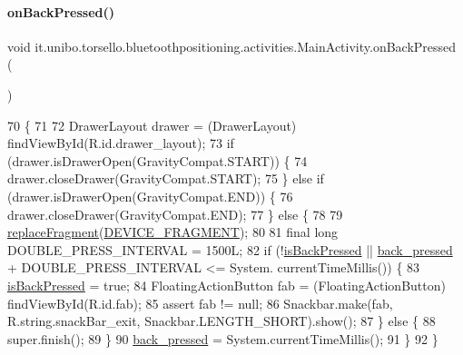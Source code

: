 \paragraph{\texorpdfstring{on\+Back\+Pressed()}{onBackPressed()}}
{\footnotesize\ttfamily void it.\+unibo.\+torsello.\+bluetoothpositioning.\+activities.\+Main\+Activity.\+on\+Back\+Pressed (\begin{DoxyParamCaption}{ }\end{DoxyParamCaption})}


\begin{DoxyCode}
70                                 \{
71 
72         DrawerLayout drawer = (DrawerLayout) findViewById(R.id.drawer\_layout);
73         \textcolor{keywordflow}{if} (drawer.isDrawerOpen(GravityCompat.START)) \{
74             drawer.closeDrawer(GravityCompat.START);
75         \} \textcolor{keywordflow}{else} \textcolor{keywordflow}{if} (drawer.isDrawerOpen(GravityCompat.END)) \{
76             drawer.closeDrawer(GravityCompat.END);
77         \} \textcolor{keywordflow}{else} \{
78 
79             \hyperlink{classit_1_1unibo_1_1torsello_1_1bluetoothpositioning_1_1activities_1_1MainActivity_a98db4478d28cd91118138d0b652ceb2c_a98db4478d28cd91118138d0b652ceb2c}{replaceFragment}(\hyperlink{classit_1_1unibo_1_1torsello_1_1bluetoothpositioning_1_1activities_1_1MainActivity_a2f77c0245ac2525dc58905e38e1817d1_a2f77c0245ac2525dc58905e38e1817d1}{DEVICE\_FRAGMENT});
80 
81             \textcolor{keyword}{final} \textcolor{keywordtype}{long} DOUBLE\_PRESS\_INTERVAL = 1500L;
82             \textcolor{keywordflow}{if} (!\hyperlink{classit_1_1unibo_1_1torsello_1_1bluetoothpositioning_1_1activities_1_1MainActivity_a73d74411ec7bb55eb827bb81018174bd_a73d74411ec7bb55eb827bb81018174bd}{isBackPressed} || \hyperlink{classit_1_1unibo_1_1torsello_1_1bluetoothpositioning_1_1activities_1_1MainActivity_a5e1ae38b2bbdcc45f2164fdc393ca495_a5e1ae38b2bbdcc45f2164fdc393ca495}{back\_pressed} + DOUBLE\_PRESS\_INTERVAL <= System.
      currentTimeMillis()) \{
83                 \hyperlink{classit_1_1unibo_1_1torsello_1_1bluetoothpositioning_1_1activities_1_1MainActivity_a73d74411ec7bb55eb827bb81018174bd_a73d74411ec7bb55eb827bb81018174bd}{isBackPressed} = \textcolor{keyword}{true};
84                 FloatingActionButton fab = (FloatingActionButton) findViewById(R.id.fab);
85                 assert fab != null;
86                 Snackbar.make(fab, R.string.snackBar\_exit, Snackbar.LENGTH\_SHORT).show();
87             \} \textcolor{keywordflow}{else} \{
88                 super.finish();
89             \}
90             \hyperlink{classit_1_1unibo_1_1torsello_1_1bluetoothpositioning_1_1activities_1_1MainActivity_a5e1ae38b2bbdcc45f2164fdc393ca495_a5e1ae38b2bbdcc45f2164fdc393ca495}{back\_pressed} = System.currentTimeMillis();
91         \}
92     \}
\end{DoxyCode}
